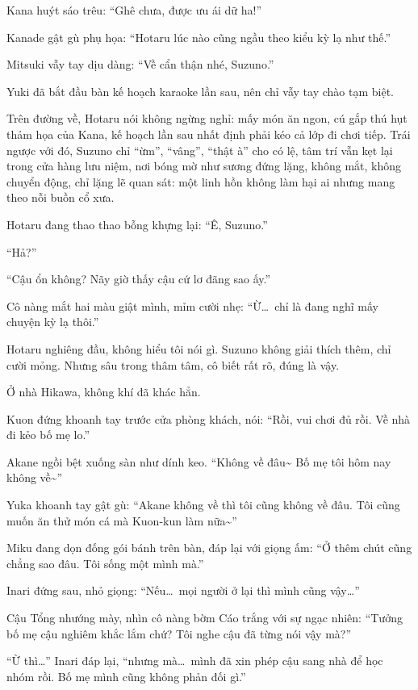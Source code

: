 \documentclass[../main.tex]{subfiles}
\begin{document}
Kana huýt sáo trêu: ``Ghê chưa, được ưu ái dữ ha!''

Kanade gật gù phụ họa: ``Hotaru lúc nào cũng ngầu theo kiểu kỳ lạ như thế.''

Mitsuki vẫy tay dịu dàng: ``Về cẩn thận nhé, Suzuno.''

Yuki đã bắt đầu bàn kế hoạch karaoke lần sau, nên chỉ vẫy tay chào tạm biệt.

Trên đường về, Hotaru nói không ngừng nghỉ: mấy món ăn ngon, cú gắp thú hụt thảm họa của Kana, kế hoạch lần sau nhất định phải kéo cả lớp đi chơi tiếp. Trái ngược với đó, Suzuno chỉ ``ừm'', ``vâng'', ``thật à'' cho có lệ, tâm trí vẫn kẹt lại trong cửa hàng lưu niệm, nơi bóng mờ như sương đứng lặng, không mắt, không chuyển động, chỉ lặng lẽ quan sát: một linh hồn không làm hại ai nhưng mang theo nỗi buồn cổ xưa.

Hotaru đang thao thao bỗng khựng lại: ``Ê, Suzuno.''

``Hả?''

``Cậu ổn không? Nãy giờ thấy cậu cứ lơ đãng sao ấy.''

Cô nàng mắt hai màu giật mình, mỉm cười nhẹ: ``Ừ\dots\ chỉ là đang nghĩ mấy chuyện kỳ lạ thôi.''

Hotaru nghiêng đầu, không hiểu tôi nói gì. Suzuno không giải thích thêm, chỉ cười mỏng. Nhưng sâu trong thâm tâm, cô biết rất rõ, đúng là vậy.

\ct

Ở nhà Hikawa, không khí đã khác hẳn.

Kuon đứng khoanh tay trước cửa phòng khách, nói: ``Rồi, vui chơi đủ rồi. Về nhà đi kẻo bố mẹ lo.''

Akane ngồi bệt xuống sàn như dính keo. ``Không về đâu\~{} Bố mẹ tôi hôm nay không về\~{}''

Yuka khoanh tay gật gù: ``Akane không về thì tôi cũng không về đâu. Tôi cũng muốn ăn thử món cá mà Kuon-kun làm nữa\~{}''

Miku đang dọn đống gói bánh trên bàn, đáp lại với giọng ấm: ``Ở thêm chút cũng chẳng sao đâu. Tôi sống một mình mà.''

Inari đứng sau, nhỏ giọng: ``Nếu\dots\ mọi người ở lại thì mình cũng vậy\dots''

Cậu Tổng nhướng mày, nhìn cô nàng bờm Cáo trắng với sự ngạc nhiên: ``Tưởng bố mẹ cậu nghiêm khắc lắm chứ? Tôi nghe cậu đã từng nói vậy mà?''

``Ừ thì\dots'' Inari đáp lại, ``nhưng mà\dots\ mình đã xin phép cậu sang nhà để học nhóm rồi. Bố mẹ mình cũng không phản đối gì.''
\end{document}
